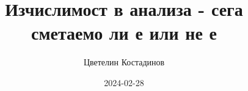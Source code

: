 \newif\ifnotes

\notestrue

\ifnotes
    \title{Изчислимост в анализа - сега сметаемо ли е или не е}
    \date{2024-02-28}
\else 
    \title{Изчислимост в анализа - домашни работи}
    \date{\today}
\fi

\author{
  Цветелин Костадинов
}

\pagestyle{fancy}
\fancyhf{}
\rhead{\thetitle}
\fancyfoot[R]{\thepage}
\lhead{
    \theauthor
}
\rfoot{\thepage}